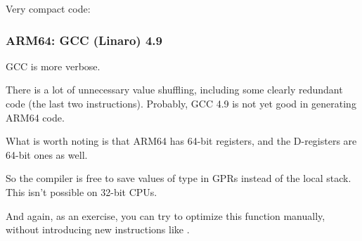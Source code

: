 Very compact code:



\subsubsection{ARM64: \NonOptimizing GCC (Linaro) 4.9}



\NonOptimizing GCC is more verbose.

There is a lot of unnecessary value shuffling, including some clearly redundant code 
(the last two  instructions). Probably, GCC 4.9 is not yet good in generating ARM64 code.

What is worth noting is that ARM64 has 64-bit registers, and the D-registers are 64-bit ones as well.

So the compiler is free to save values of type \Tdouble in \ac{GPR}s instead of the local stack.
This isn't possible on 32-bit CPUs.

And again, as an exercise, you can try to optimize this function manually, without introducing
new instructions like .
